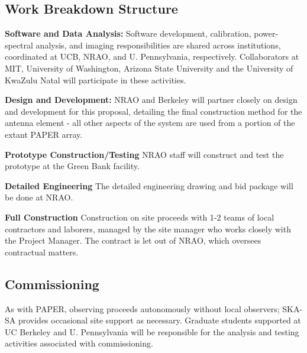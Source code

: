 \documentclass[preprint]{aastex}
\begin{document}
\vspace{-0.25in}
\subsection{Work Breakdown Structure}
\vspace{-6pt}


\noindent
{\bf Software and Data Analysis:}
Software development, calibration, power-spectral analysis, and imaging responsibilities 
are shared across institutions, coordinated at UCB, NRAO, and U. Pennsylvania, respectively.   
Collaborators at MIT, University of Washington, Arizona State University and the University
of KwaZulu Natal will participate in these activities.

\noindent
{\bf Design and Development:}
NRAO and Berkeley will partner closely on design and development for this proposal, detailing the final construction method for the antenna
element - all other aspects of the system are used from a portion of the extant PAPER array.

\noindent
{\bf Prototype Construction/Testing}
NRAO staff will construct and test the prototype at the Green Bank facility.

\noindent
{\bf Detailed Engineering}
The detailed engineering drawing and bid package will be done at NRAO.

\noindent
{\bf Full Construction}
Construction on site proceeds with 1-2 teams of
local contractors and laborers, managed by the site manager who works closely
with the Project Manager.  The contract is let out of NRAO, which oversees 
contractual matters.



\vspace{-0.25in}
\subsection{Commissioning}
\vspace{-6pt}
As with PAPER, observing proceeds autonomously without local observers; SKA-SA
provides occasional site support as necessary.  Graduate students supported
at UC Berkeley and U. Pennsylvania will be responsible for the analysis and
testing activities associated with commissioning.
\end{document}
